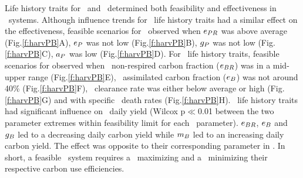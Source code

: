 \documentclass[../thesis.tex]{subfiles} %
\begin{document}
Life history traits for \phy\ and \bac\ determined both feasibility and effectiveness in \PBH\ systems.  Although influence trends for \phy\ life history traits had a similar effect on the effectiveness, feasible scenarios for \PBH\ observed when $e_{PR}$ was above average (Fig.\ref{f:harvPB}A), $e_P$ was not low (Fig.\ref{f:harvPB}B), $g_P$ was not low (Fig.\ref{f:harvPB}C), $a_P$ was low (Fig.\ref{f:harvPB}D).  For \bac\ life history traits, feasible scenarios for \PBH observed when \bac\ non-respired carbon fraction ($e_{BR}$) was in a mid-upper range (Fig.\ref{f:harvPB}E), \bac\ assimilated carbon fraction ($e_B$) was not around 40\% (Fig.\ref{f:harvPB}F), \bac\ clearance rate was either below average or high (Fig.\ref{f:harvPB}G) and with specific \bac\ death rates (Fig.\ref{f:harvPB}H).  \Bac\ life history traits had significant influence on \PBH\ daily yield (Wilcox p$\ll$0.01 between the two parameter extremes within feasibility limit for each \bac\ parameter).  $e_{BR}$, $e_B$ and $g_B$ led to a decreasing daily carbon yield while $m_B$ led to an increasing daily carbon yield.  The effect was opposite to their corresponding parameter in \phy.  In short, a feasible \PBH\ system requires a \phy\ maximizing and a \bac\ minimizing their respective carbon use efficiencies.
\end{document}
